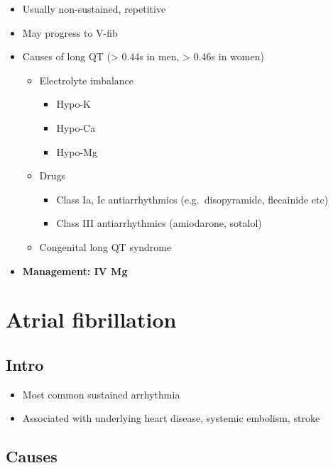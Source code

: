 \documentclass[
  12pt,
]{memoir}
\providecommand{\tightlist}{%
  \setlength{\itemsep}{0pt}\setlength{\parskip}{0pt}}
\begin{document}
\begin{itemize}
\tightlist
\item
  Usually non-sustained, repetitive
\item
  May progress to V-fib
\item
  Causes of long QT (\textgreater{} 0.44s in men, \textgreater{} 0.46s
  in women)

  \begin{itemize}
  \tightlist
  \item
    Electrolyte imbalance

    \begin{itemize}
    \tightlist
    \item
      Hypo-K
    \item
      Hypo-Ca
    \item
      Hypo-Mg
    \end{itemize}
  \item
    Drugs

    \begin{itemize}
    \tightlist
    \item
      Class Ia, Ic antiarrhythmics (e.g.~disopyramide, flecainide etc)
    \item
      Class III antiarrhythmics (amiodarone, sotalol)
    \end{itemize}
  \item
    Congenital long QT syndrome
  \end{itemize}
\item
  \textbf{Management: IV Mg}
\end{itemize}

\hypertarget{atrial-fibrillation}{%
\section{Atrial fibrillation}\label{atrial-fibrillation}}

\hypertarget{intro-1}{%
\subsection{Intro}\label{intro-1}}

\begin{itemize}
\tightlist
\item
  Most common sustained arrhythmia
\item
  Associated with underlying heart disease, systemic embolism, stroke
\end{itemize}

\hypertarget{causes}{%
\subsection{Causes}\label{causes}}
\end{document}
